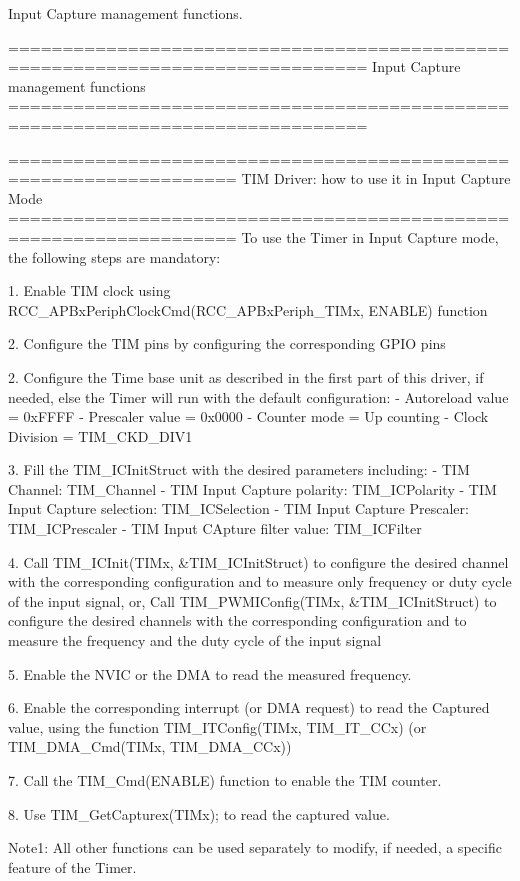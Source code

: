 Input Capture management functions. \begin{DoxyVerb} ===============================================================================
                      Input Capture management functions
 ===============================================================================  
   
       ===================================================================      
              TIM Driver: how to use it in Input Capture Mode
       =================================================================== 
       To use the Timer in Input Capture mode, the following steps are mandatory:
       
       1. Enable TIM clock using RCC_APBxPeriphClockCmd(RCC_APBxPeriph_TIMx, ENABLE) function
       
       2. Configure the TIM pins by configuring the corresponding GPIO pins
       
       2. Configure the Time base unit as described in the first part of this driver,
          if needed, else the Timer will run with the default configuration:
          - Autoreload value = 0xFFFF
          - Prescaler value = 0x0000
          - Counter mode = Up counting
          - Clock Division = TIM_CKD_DIV1
          
       3. Fill the TIM_ICInitStruct with the desired parameters including:
          - TIM Channel: TIM_Channel
          - TIM Input Capture polarity: TIM_ICPolarity
          - TIM Input Capture selection: TIM_ICSelection
          - TIM Input Capture Prescaler: TIM_ICPrescaler
          - TIM Input CApture filter value: TIM_ICFilter
       
       4. Call TIM_ICInit(TIMx, &TIM_ICInitStruct) to configure the desired channel with the 
          corresponding configuration and to measure only frequency or duty cycle of the input signal,
          or,
          Call TIM_PWMIConfig(TIMx, &TIM_ICInitStruct) to configure the desired channels with the 
          corresponding configuration and to measure the frequency and the duty cycle of the input signal
          
       5. Enable the NVIC or the DMA to read the measured frequency. 
          
       6. Enable the corresponding interrupt (or DMA request) to read the Captured value,
          using the function TIM_ITConfig(TIMx, TIM_IT_CCx) (or TIM_DMA_Cmd(TIMx, TIM_DMA_CCx)) 
       
       7. Call the TIM_Cmd(ENABLE) function to enable the TIM counter.
       
       8. Use TIM_GetCapturex(TIMx); to read the captured value.
       
       Note1: All other functions can be used separately to modify, if needed,
              a specific feature of the Timer. \end{DoxyVerb}
 

